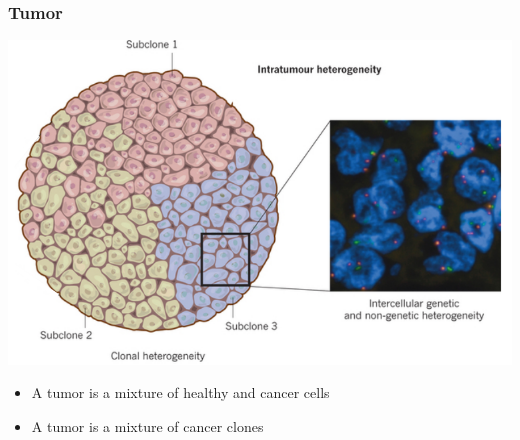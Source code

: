 

\begin{frame}
\frametitle{Tumor}

\centering
  \includegraphics[width=0.8\linewidth]{figures/tumor-heterogeneous}
  \begin{itemize}
    \item 
      A \alert{tumor} is a mixture of healthy and cancer cells
    \item 
      A \alert{tumor} is a mixture of cancer clones
\end{itemize}
\end{frame}


